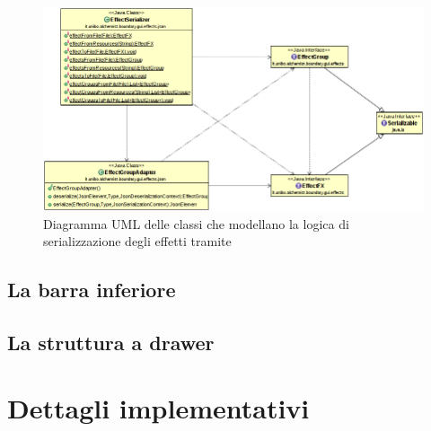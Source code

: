                \begin{figure}[htbp]
                    \centering
                    \includegraphics[scale=0.5]{img/EffectSerializationUML}
                    \caption{Diagramma UML delle classi che modellano la logica di serializzazione degli effetti tramite } %
                    \label{fig:serial}
                \end{figure}

        \subsection{La barra inferiore}\label{sub:barra}


        \subsection{La struttura a drawer}\label{sub:drawer}



    \section{Dettagli implementativi}\label{sec:dettagli}
